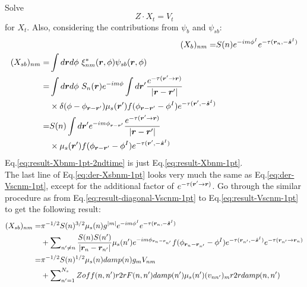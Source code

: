 \documentclass [10pt,letterpaper]{article}
\renewcommand{\vec}{\vectorsym}
\newcommand{\unitvec}[1]{\hat{\vec{#1}}}
\begin{document}
\\
Solve
\begin{equation} \label{eq:Z-Xt-Vt}
	Z\cdot X_t = V_t
\end{equation}
for $X_t$.
Also, considering the contributions from $\psi_b$ and $\psi_{sb}$:
\begin{subequations} \label{eq:result-Xbnm-1pt-2ndtime-der-Xsbnm-1pt}
	\begin{align} 
		(X_b)_{n m}
		=&
		S(n)
		e^{-i m \phi^I}
		e^{-\tau(\vec{r}_n,-\unitvec{s}^I)}
		\label{eq:result-Xbnm-1pt-2ndtime}
		\\
		\begin{split}
			(X_{sb})_{n m}
			=&
			\int d\vec{r} d\phi
			\ \xi^*_{n m}(\vec{r},\phi)
			\psi_{sb}(\vec{r},\phi)
			\\
			=& 
			\int d\vec{r} d\phi
			\ S_n(\vec{r})
			e^{-i m \phi}
			\int d\vec{r}^\prime
			\frac
			{e^{-\tau(\vec{r}^\prime\to\vec{r})}}
			{\lvert \vec{r}-\vec{r}^\prime \rvert}
			\\
			&
			\times
			\delta(\phi-\phi_{\vec{r}-\vec{r}^\prime})
			\mu_s(\vec{r}^\prime)
			f(\phi_{\vec{r}-\vec{r}^\prime}-\phi^I)
			e^{-\tau(\vec{r}^\prime,-\unitvec{s}^I)} 
			\\
			=& 
			S(n)
			\int
			d\vec{r}^\prime
			e^{-i m \phi_{\vec{r}-\vec{r}^\prime}}
			\frac
			{e^{-\tau(\vec{r}^\prime\to\vec{r})}}
			{\lvert \vec{r}-\vec{r}^\prime \rvert}
			\\
			&
			\times
			\mu_s(\vec{r}^\prime)
			f(\phi_{\vec{r}-\vec{r}^\prime}-\phi^I)
			e^{-\tau(\vec{r}^\prime,-\unitvec{s}^I)} 
		\end{split}
		\label{eq:der-Xsbnm-1pt}
	\end{align}
\end{subequations}
Eq.\eqref{eq:result-Xbnm-1pt-2ndtime} is just Eq.\eqref{eq:result-Xbnm-1pt}.
\\
The last line of Eq.\eqref{eq:der-Xsbnm-1pt} looks very much the same as Eq.\eqref{eq:der-Vscnm-1pt}, except for the additional factor of $e^{-\tau(\vec{r}^\prime \to \vec{r})}$. 
Go through the similar procedure as from Eq.\eqref{eq:result-diagonal-Vscnm-1pt} to Eq.\eqref{eq:result-Vscnm-1pt} to get the following result:
\begin{equation} \label{eq:result-Xsbnm-1pt}
	\begin{split} 
		(X_{sb})_{n m}
		=&
		\pi^{-1/2}
		S(n)^{3/2}
		\mu_s(n)
		g^{\lvert m \rvert}
		e^{-i m \phi^I }
		e^{-\tau(\vec{r}_n,-\unitvec{s}^I)} 
		\\
		&+
		\sum \nolimits_{n^\prime \neq n}
		\frac
		{S(n)S(n^\prime)}
		{\lvert \vec{r}_n - \vec{r}_{n^\prime} \rvert} 
		\mu_s(n^\prime)
		e^{-i m \phi_{\vec{r}_n - \vec{r}_{n^\prime}}}
		f(\phi_{\vec{r}_n - \vec{r}_{n^\prime}}-\phi^I)
		e^{-\tau(\vec{r}_{n^\prime},-\unitvec{s}^I)} 
		e^{-\tau(\vec{r}_{n^\prime} \to \vec{r}_n)} 
		\\
		=&
		\pi^{-1/2}
		S(n)^{1/2}
		\mu_s(n)
		damp(n)
		g_m
		V_{n m}
		\\
		&+
		\sum \nolimits_{n^\prime=1}^{N_s}
		Zoff(n,n^\prime)
		r2rF(n,n^\prime)
		damp(n^\prime)
		\mu_s(n^\prime)
		(v_{n n^\prime})_m
		r2rdamp(n,n^\prime)
	\end{split}
\end{equation}
\end{document}
